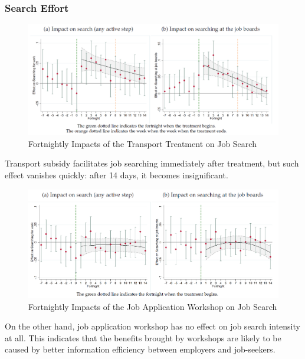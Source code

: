         \subsubsection{Search Effort}
            \begin{figure}[H]
                \centering
                \includegraphics[width=5.5in]{images/ch6/Abebe result 3 search effort transport.png}
                \caption{Fortnightly Impacts of the Transport Treatment on Job Search}
            \end{figure}
            Transport subsidy facilitates job searching immediately after treatment, but such effect vanishes quickly: after 14 days, it becomes insignificant.
            \begin{figure}[H]
                \centering
                \includegraphics[width=5.5in]{images/ch6/Abebe result 3 search effort workshop.png}
                \caption{Fortnightly Impacts of the Job Application Workshop on Job Search}
            \end{figure}
            On the other hand, job application workshop has no effect on job search intensity at all. This indicates that the benefits brought by workshops are likely to be caused by better information efficiency between employers and job-seekers.
            
